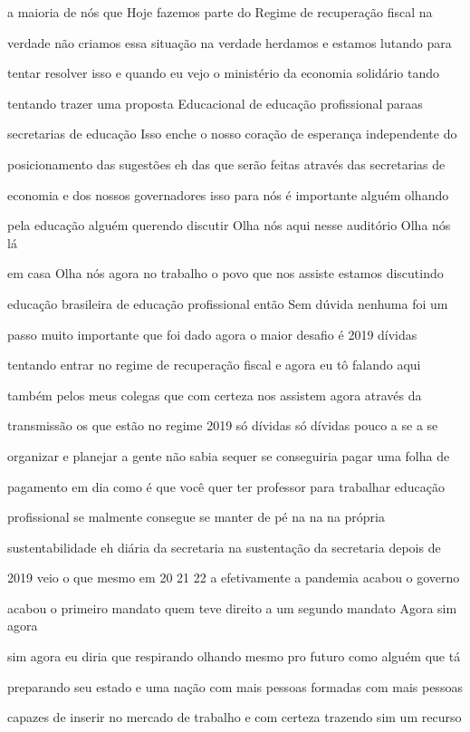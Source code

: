 \documentclass[a4paper,12pt]{article}
\begin{document}
a maioria de nós que Hoje fazemos parte do Regime de recuperação fiscal na

verdade não criamos essa situação na verdade herdamos e estamos lutando para

tentar resolver isso e quando eu vejo o ministério da economia solidário tando

tentando trazer uma proposta Educacional de educação profissional paraas

secretarias de educação Isso enche o nosso coração de esperança independente do

posicionamento das sugestões eh das que serão feitas através das secretarias de

economia e dos nossos governadores isso para nós é importante alguém olhando

pela educação alguém querendo discutir Olha nós aqui nesse auditório Olha nós lá

em casa Olha nós agora no trabalho o povo que nos assiste estamos discutindo

educação brasileira de educação profissional então Sem dúvida nenhuma foi um

passo muito importante que foi dado agora o maior desafio é 2019 dívidas

tentando entrar no regime de recuperação fiscal e agora eu tô falando aqui

também pelos meus colegas que com certeza nos assistem agora através da

transmissão os que estão no regime 2019 só dívidas só dívidas pouco a se a se

organizar e planejar a gente não sabia sequer se conseguiria pagar uma folha de

pagamento em dia como é que você quer ter professor para trabalhar educação

profissional se malmente consegue se manter de pé na na na própria

sustentabilidade eh diária da secretaria na sustentação da secretaria depois de

2019 veio o que mesmo em 20 21 22 a efetivamente a pandemia acabou o governo

acabou o primeiro mandato quem teve direito a um segundo mandato Agora sim agora

sim agora eu diria que respirando olhando mesmo pro futuro como alguém que tá

preparando seu estado e uma nação com mais pessoas formadas com mais pessoas

capazes de inserir no mercado de trabalho e com certeza trazendo sim um recurso
\end{document}
